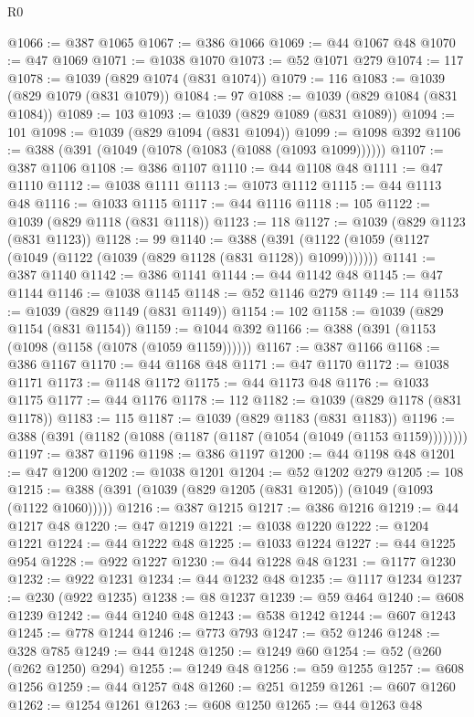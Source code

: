 \begin{lexlean}{R0}
\begin{coremodule}
@1066 := @387 @1065
@1067 := @386 @1066
@1069 := @44 @1067 @48
@1070 := @47 @1069
@1071 := @1038 @1070
@1073 := @52 @1071 @279
@1074 := 117
@1078 := @1039 (@829 @1074 (@831 @1074))
@1079 := 116
@1083 := @1039 (@829 @1079 (@831 @1079))
@1084 := 97
@1088 := @1039 (@829 @1084 (@831 @1084))
@1089 := 103
@1093 := @1039 (@829 @1089 (@831 @1089))
@1094 := 101
@1098 := @1039 (@829 @1094 (@831 @1094))
@1099 := @1098 @392
@1106 := @388 (@391 (@1049 (@1078 (@1083 (@1088 (@1093 @1099))))))
@1107 := @387 @1106
@1108 := @386 @1107
@1110 := @44 @1108 @48
@1111 := @47 @1110
@1112 := @1038 @1111
@1113 := @1073 @1112
@1115 := @44 @1113 @48
@1116 := @1033 @1115
@1117 := @44 @1116
@1118 := 105
@1122 := @1039 (@829 @1118 (@831 @1118))
@1123 := 118
@1127 := @1039 (@829 @1123 (@831 @1123))
@1128 := 99
@1140 := @388 (@391 (@1122 (@1059 (@1127 (@1049 (@1122 (@1039 (@829 @1128 (@831 @1128)) @1099)))))))
@1141 := @387 @1140
@1142 := @386 @1141
@1144 := @44 @1142 @48
@1145 := @47 @1144
@1146 := @1038 @1145
@1148 := @52 @1146 @279
@1149 := 114
@1153 := @1039 (@829 @1149 (@831 @1149))
@1154 := 102
@1158 := @1039 (@829 @1154 (@831 @1154))
@1159 := @1044 @392
@1166 := @388 (@391 (@1153 (@1098 (@1158 (@1078 (@1059 @1159))))))
@1167 := @387 @1166
@1168 := @386 @1167
@1170 := @44 @1168 @48
@1171 := @47 @1170
@1172 := @1038 @1171
@1173 := @1148 @1172
@1175 := @44 @1173 @48
@1176 := @1033 @1175
@1177 := @44 @1176
@1178 := 112
@1182 := @1039 (@829 @1178 (@831 @1178))
@1183 := 115
@1187 := @1039 (@829 @1183 (@831 @1183))
@1196 := @388 (@391 (@1182 (@1088 (@1187 (@1187 (@1054 (@1049 (@1153 @1159))))))))
@1197 := @387 @1196
@1198 := @386 @1197
@1200 := @44 @1198 @48
@1201 := @47 @1200
@1202 := @1038 @1201
@1204 := @52 @1202 @279
@1205 := 108
@1215 := @388 (@391 (@1039 (@829 @1205 (@831 @1205)) (@1049 (@1093 (@1122 @1060)))))
@1216 := @387 @1215
@1217 := @386 @1216
@1219 := @44 @1217 @48
@1220 := @47 @1219
@1221 := @1038 @1220
@1222 := @1204 @1221
@1224 := @44 @1222 @48
@1225 := @1033 @1224
@1227 := @44 @1225 @954
@1228 := @922 @1227
@1230 := @44 @1228 @48
@1231 := @1177 @1230
@1232 := @922 @1231
@1234 := @44 @1232 @48
@1235 := @1117 @1234
@1237 := @230 (@922 @1235)
@1238 := @8 @1237
@1239 := @59 @464
@1240 := @608 @1239
@1242 := @44 @1240 @48
@1243 := @538 @1242
@1244 := @607 @1243
@1245 := @778 @1244
@1246 := @773 @793
@1247 := @52 @1246
@1248 := @328 @785
@1249 := @44 @1248
@1250 := @1249 @60
@1254 := @52 (@260 (@262 @1250) @294)
@1255 := @1249 @48
@1256 := @59 @1255
@1257 := @608 @1256
@1259 := @44 @1257 @48
@1260 := @251 @1259
@1261 := @607 @1260
@1262 := @1254 @1261
@1263 := @608 @1250
@1265 := @44 @1263 @48

\end{coremodule}
\end{lexlean}
